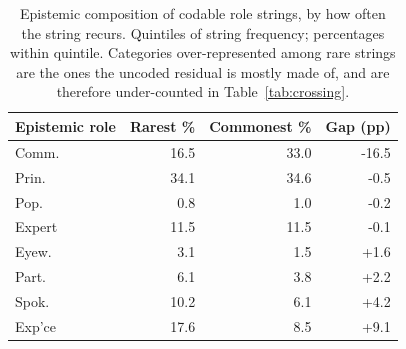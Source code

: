 \begin{table}[htbp]
\centering\small
\caption{Epistemic composition of codable role strings, by how often the string recurs. Quintiles of string frequency; percentages within quintile. Categories over-represented among rare strings are the ones the uncoded residual is mostly made of, and are therefore under-counted in Table~\ref{tab:crossing}.}
\label{tab:rarity}
\begin{tabular}{lrrr}
\hline\hline
Epistemic role & Rarest \% & Commonest \% & Gap (pp) \\
\hline
Comm. & 16.5 & 33.0 & -16.5 \\
Prin. & 34.1 & 34.6 & -0.5 \\
Pop. & 0.8 & 1.0 & -0.2 \\
Expert & 11.5 & 11.5 & -0.1 \\
Eyew. & 3.1 & 1.5 & +1.6 \\
Part. & 6.1 & 3.8 & +2.2 \\
Spok. & 10.2 & 6.1 & +4.2 \\
Exp'ce & 17.6 & 8.5 & +9.1 \\
\hline\hline
\end{tabular}
\end{table}
